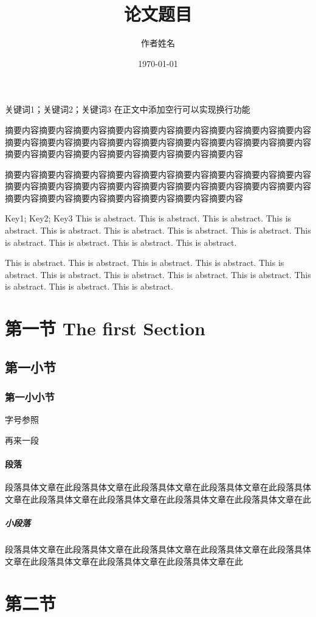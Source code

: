 \documentclass[a4paper,cs4size,UTF8,winfonts,boldfont,slantfont]{ctexart}
\title{论文题目} %
\author{作者姓名} %
\date{\today} %
\begin{document}
	\maketitle
	
	
	\begin{cnabstract}{关键词1；关键词2；关键词3}
		在正文中添加空行可以实现换行功能
		
		摘要内容摘要内容摘要内容摘要内容摘要内容摘要内容摘要内容摘要内容摘要内容摘要内容摘要内容摘要内容摘要内容摘要内容摘要内容摘要内容摘要内容摘要内容摘要内容摘要内容摘要内容摘要内容摘要内容摘要内容摘要内容
		
		摘要内容摘要内容摘要内容摘要内容摘要内容摘要内容摘要内容摘要内容摘要内容摘要内容摘要内容摘要内容摘要内容摘要内容摘要内容摘要内容摘要内容摘要内容摘要内容摘要内容摘要内容摘要内容摘要内容摘要内容摘要内容
	\end{cnabstract}
	\begin{enabstract}{Key1; Key2; Key3}
		This is abstract. This is abstract. This is abstract. This is abstract. This is abstract. This is abstract. This is abstract. This is abstract. This is abstract. This is abstract. This is abstract. This is abstract. 
		
		This is abstract. This is abstract. This is abstract. This is abstract. This is abstract. This is abstract. This is abstract. This is abstract. This is abstract. This is abstract. This is abstract. This is abstract. 
	\end{enabstract}
	
	\tableofcontents
	
	\section{第一节 The first Section}
	\subsection{第一小节}
	\subsubsection{第一小小节}
	字号参照
	
	再来一段
	\paragraph{段落}段落具体文章在此段落具体文章在此段落具体文章在此段落具体文章在此段落具体文章在此段落具体文章在此段落具体文章在此段落具体文章在此段落具体文章在此
	\subparagraph{小段落}段落具体文章在此段落具体文章在此段落具体文章在此段落具体文章在此段落具体文章在此段落具体文章在此段落具体文章在此段落具体文章在此
	\section{第二节}
\end{document}
